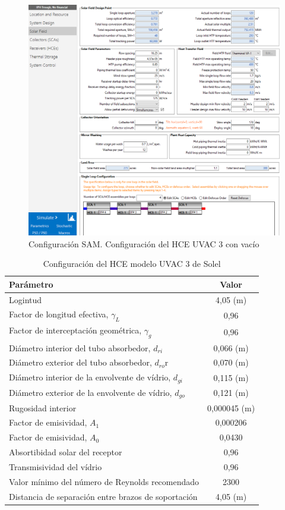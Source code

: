 \begin{figure}[H]
\includegraphics[width=0.9\linewidth]{images/captura_sam_iph03.png}
\caption{Configuración SAM. Configuración del HCE UVAC 3 con vacío}
\label{fig:captura04}
\end{figure}


\begin{table}[H]
\centering
\caption{Configuración del HCE modelo UVAC 3 de Solel}
\label{tab:configuracionHCE}
\begin{tabular}{lc}
Parámetro & Valor \\ \hline
Logintud & 4,05 (m) \\
Factor de longitud efectiva, \(\gamma_L\) &  0,96 \\
Factor de interceptación geométrica, \(\gamma_g\) & 0,96 \\
Diámetro interior del tubo absorbedor, \(d_{ri}\) & 0,066 (m) \\
Diámetro exterior del tubo absorbedor, \(d_{ro}\)r &  0,070 (m) \\ 
Diámetro interior de la envolvente de vídrio, \(d_{gi}\) &  0,115 (m) \\
Diámetro exterior de la envolvente de vídrio, \(d_{go}\) &  0,121 (m) \\
Rugosidad interior &  0,000045 (m)  \\
Factor de emisividad, \(A_1\) &  0,000206 \\
Factor de emisividad, \(A_0\) &  0,0430 \\
Absortibidad solar del receptor &  0,96 \\
Transmisividad del vídrio &  0,96 \\
Valor mínimo del número de Reynolds recomendado &  2300 \\
Distancia de separación entre brazos de soportación &  4,05 (m) 
\end{tabular}
\end{table}

